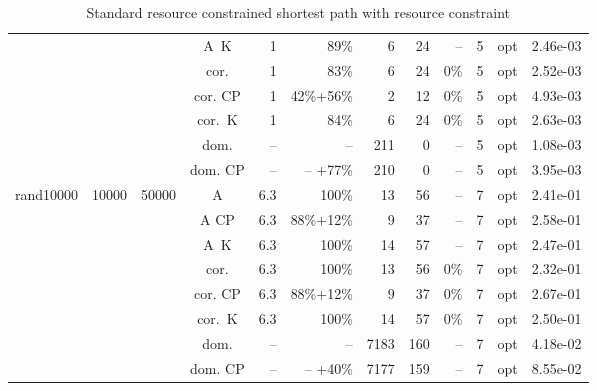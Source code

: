 \documentclass[11pt]{amsart}
\newenvironment{outdent}
{\begin{list}{}{\leftmargin-2cm\rightmargin\leftmargin}\centering\item\relax}
{\end{list}\ignorespacesafterend}
\theoremstyle{plain}
\theoremstyle{remark}
\begin{document}
\begin{table}
\begin{outdent}
\begin{footnotesize}
\begin{tabular}{|l|rrc|rr|rrr|rr|r|}
&&&A~K & 1 & 89\% &6 & 24 & -- &5 & opt & 2.46e-03 \\
&&&cor. & 1 & 83\% &6 & 24 & 0\% &5 & opt & 2.52e-03 \\
&&&cor. CP & 1 & 42\%+56\% &2 & 12 & 0\% &5 & opt & 4.93e-03 \\
&&&cor.~K & 1 & 84\% &6 & 24 & 0\% &5 & opt & 2.63e-03 \\
&&&dom. & -- & --  &211 & 0 & -- &5 & opt & 1.08e-03 \\
&&&dom. CP & -- & -- +77\% &210 & 0 & -- &5 & opt & 3.95e-03 \\
\hline
rand10000 & 10000 & 50000 & A & 6.3 & 100\% &13 & 56 & -- &7 & opt & 2.41e-01 \\
&&&A CP & 6.3 & 88\%+12\% &9 & 37 & -- &7 & opt & 2.58e-01 \\
&&&A~K & 6.3 & 100\% &14 & 57 & -- &7 & opt & 2.47e-01 \\
&&&cor. & 6.3 & 100\% &13 & 56 & 0\% &7 & opt & 2.32e-01 \\
&&&cor. CP & 6.3 & 88\%+12\% &9 & 37 & 0\% &7 & opt & 2.67e-01 \\
&&&cor.~K & 6.3 & 100\% &14 & 57 & 0\% &7 & opt & 2.50e-01 \\
&&&dom. & -- & --  &7183 & 160 & -- &7 & opt & 4.18e-02 \\
&&&dom. CP & -- & -- +40\% &7177 & 159 & -- &7 & opt & 8.55e-02 \\
\hline
\end{tabular}
\end{footnotesize}
\end{outdent}
\caption{Standard resource constrained shortest path with  resource constraint}
\label{tab:RCSP10constraints}
\end{table}
\end{document}

